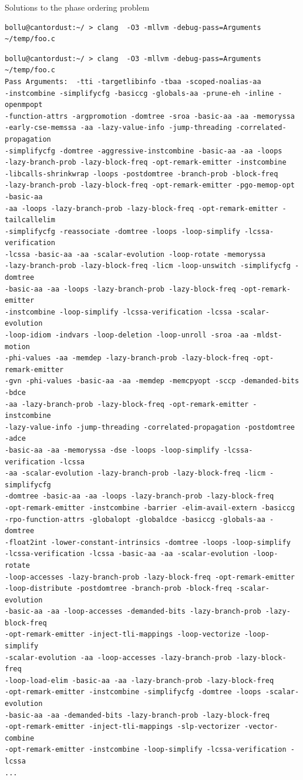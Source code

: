 \documentclass[8pt]{beamer}
\begin{document}
\begin{frame}[fragile]{Solutions to the phase ordering problem}

\pause
\begin{verbatim}
bollu@cantordust:~/ > clang  -O3 -mllvm -debug-pass=Arguments ~/temp/foo.c
\end{verbatim}
\pause
\begin{verbatim}
bollu@cantordust:~/ > clang  -O3 -mllvm -debug-pass=Arguments ~/temp/foo.c
Pass Arguments:  -tti -targetlibinfo -tbaa -scoped-noalias-aa
-instcombine -simplifycfg -basiccg -globals-aa -prune-eh -inline -openmpopt
-function-attrs -argpromotion -domtree -sroa -basic-aa -aa -memoryssa
-early-cse-memssa -aa -lazy-value-info -jump-threading -correlated-propagation
-simplifycfg -domtree -aggressive-instcombine -basic-aa -aa -loops
-lazy-branch-prob -lazy-block-freq -opt-remark-emitter -instcombine
-libcalls-shrinkwrap -loops -postdomtree -branch-prob -block-freq
-lazy-branch-prob -lazy-block-freq -opt-remark-emitter -pgo-memop-opt -basic-aa
-aa -loops -lazy-branch-prob -lazy-block-freq -opt-remark-emitter -tailcallelim
-simplifycfg -reassociate -domtree -loops -loop-simplify -lcssa-verification
-lcssa -basic-aa -aa -scalar-evolution -loop-rotate -memoryssa
-lazy-branch-prob -lazy-block-freq -licm -loop-unswitch -simplifycfg -domtree
-basic-aa -aa -loops -lazy-branch-prob -lazy-block-freq -opt-remark-emitter
-instcombine -loop-simplify -lcssa-verification -lcssa -scalar-evolution
-loop-idiom -indvars -loop-deletion -loop-unroll -sroa -aa -mldst-motion
-phi-values -aa -memdep -lazy-branch-prob -lazy-block-freq -opt-remark-emitter
-gvn -phi-values -basic-aa -aa -memdep -memcpyopt -sccp -demanded-bits -bdce
-aa -lazy-branch-prob -lazy-block-freq -opt-remark-emitter -instcombine
-lazy-value-info -jump-threading -correlated-propagation -postdomtree -adce
-basic-aa -aa -memoryssa -dse -loops -loop-simplify -lcssa-verification -lcssa
-aa -scalar-evolution -lazy-branch-prob -lazy-block-freq -licm -simplifycfg
-domtree -basic-aa -aa -loops -lazy-branch-prob -lazy-block-freq
-opt-remark-emitter -instcombine -barrier -elim-avail-extern -basiccg
-rpo-function-attrs -globalopt -globaldce -basiccg -globals-aa -domtree
-float2int -lower-constant-intrinsics -domtree -loops -loop-simplify
-lcssa-verification -lcssa -basic-aa -aa -scalar-evolution -loop-rotate
-loop-accesses -lazy-branch-prob -lazy-block-freq -opt-remark-emitter
-loop-distribute -postdomtree -branch-prob -block-freq -scalar-evolution
-basic-aa -aa -loop-accesses -demanded-bits -lazy-branch-prob -lazy-block-freq
-opt-remark-emitter -inject-tli-mappings -loop-vectorize -loop-simplify
-scalar-evolution -aa -loop-accesses -lazy-branch-prob -lazy-block-freq
-loop-load-elim -basic-aa -aa -lazy-branch-prob -lazy-block-freq
-opt-remark-emitter -instcombine -simplifycfg -domtree -loops -scalar-evolution
-basic-aa -aa -demanded-bits -lazy-branch-prob -lazy-block-freq
-opt-remark-emitter -inject-tli-mappings -slp-vectorizer -vector-combine
-opt-remark-emitter -instcombine -loop-simplify -lcssa-verification -lcssa
...
\end{verbatim}
\end{frame}
\end{document}
